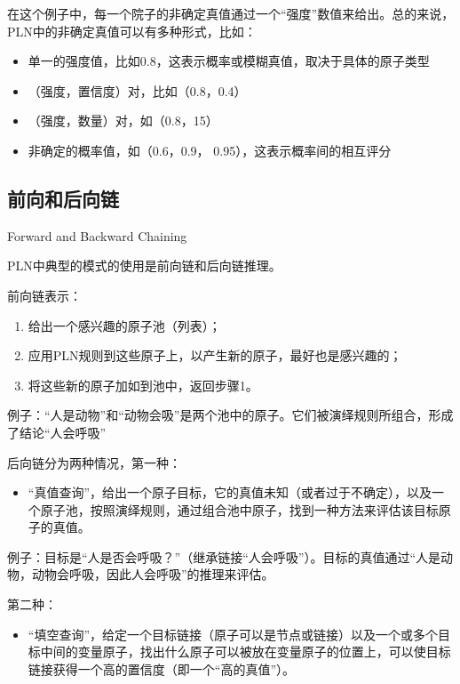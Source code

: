 在这个例子中，每一个院子的非确定真值通过一个“强度”数值来给出。总的来说，PLN中的非确定真值可以有多种形式，比如：

\begin{itemize}
\item 单一的强度值，比如0.8，这表示概率或模糊真值，取决于具体的原子类型
\item （强度，置信度）对，比如（0.8，0.4）
\item （强度，数量）对，如（0.8，15）
\item 非确定的概率值，如（0.6，0.9， 0.95），这表示概率间的相互评分
\end{itemize}

\subsection{前向和后向链}{Forward and Backward Chaining}

PLN中典型的模式的使用是前向链和后向链推理。

前向链表示：

\begin{enumerate}
\item 给出一个感兴趣的原子池（列表）；
\item 应用PLN规则到这些原子上，以产生新的原子，最好也是感兴趣的；
\item 将这些新的原子加如到池中，返回步骤1。
\end{enumerate}

例子：“人是动物”和“动物会吸”是两个池中的原子。它们被演绎规则所组合，形成了结论“人会呼吸”

后向链分为两种情况，第一种：

\begin{itemize}
\item “真值查询”，给出一个原子目标，它的真值未知（或者过于不确定），以及一个原子池，按照演绎规则，通过组合池中原子，找到一种方法来评估该目标原子的真值。
\end{itemize}

例子：目标是“人是否会呼吸？”（继承链接“人会呼吸”）。目标的真值通过“人是动物，动物会呼吸，因此人会呼吸”的推理来评估。

第二种：

\begin{itemize}
\item “填空查询”，给定一个目标链接（原子可以是节点或链接）以及一个或多个目标中间的变量原子，找出什么原子可以被放在变量原子的位置上，可以使目标链接获得一个高的置信度（即一个“高的真值”）。
\end{itemize}

